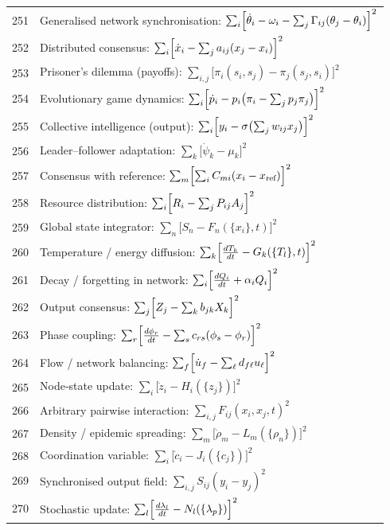 \documentclass[12pt,a4paper]{article}
\begin{document}
\begin{longtable}{r l}
		251 & Generalised network synchronisation: $\sum_i\Bigl[\dot\theta_i - \omega_i - \sum_j\Gamma_{ij}(\theta_j-\theta_i)\Bigr]^2$ \\
		252 & Distributed consensus: $\sum_i\Bigl[\dot x_i - \sum_j a_{ij}(x_j-x_i)\Bigr]^2$ \\
		253 & Prisoner's dilemma (payoffs): $\sum_{i,j}\bigl[\pi_i(s_i,s_j) - \pi_j(s_j,s_i)\bigr]^2$ \\
		254 & Evolutionary game dynamics: $\sum_i\Bigl[\dot p_i - p_i\bigl(\pi_i - \sum_j p_j\pi_j\bigr)\Bigr]^2$ \\
		255 & Collective intelligence (output): $\sum_i\Bigl[y_i - \sigma\bigl(\sum_j w_{ij}x_j\bigr)\Bigr]^2$ \\
		256 & Leader–follower adaptation: $\sum_k\bigl[\dot\psi_k - \mu_k\bigr]^2$ \\
		257 & Consensus with reference: $\sum_m\Bigl[\sum_i C_{mi}(x_i-x_{\text{ref}})\Bigr]^2$ \\
		258 & Resource distribution: $\sum_i\Bigl[R_i - \sum_j P_{ij}A_j\Bigr]^2$ \\
		259 & Global state integrator: $\sum_n\bigl[S_n - F_n(\{x_i\},t)\bigr]^2$ \\
		260 & Temperature / energy diffusion: $\sum_k\Bigl[\frac{dT_k}{dt} - G_k(\{T_l\},t)\Bigr]^2$ \\
		261 & Decay / forgetting in network: $\sum_i\Bigl[\frac{dQ_i}{dt} + \alpha_i Q_i\Bigr]^2$ \\
		262 & Output consensus: $\sum_j\Bigl[Z_j - \sum_k b_{jk}X_k\Bigr]^2$ \\
		263 & Phase coupling: $\sum_r\Bigl[\frac{d\phi_r}{dt} - \sum_s c_{rs}(\phi_s-\phi_r)\Bigr]^2$ \\
		264 & Flow / network balancing: $\sum_f\Bigl[\dot u_f - \sum_\ell d_{f\ell}u_\ell\Bigr]^2$ \\
		265 & Node‑state update: $\sum_i\bigl[\dot z_i - H_i(\{z_j\})\bigr]^2$ \\
		266 & Arbitrary pairwise interaction: $\sum_{i,j}F_{ij}(x_i,x_j,t)^2$ \\
		267 & Density / epidemic spreading: $\sum_m\bigl[\dot\rho_m - L_m(\{\rho_n\})\bigr]^2$ \\
		268 & Coordination variable: $\sum_i\bigl[\dot c_i - J_i(\{c_j\})\bigr]^2$ \\
		269 & Synchronised output field: $\sum_{i,j}S_{ij}(y_i-y_j)^2$ \\
		270 & Stochastic update: $\sum_l\Bigl[\frac{d\lambda_l}{dt} - N_l(\{\lambda_p\})\Bigr]^2$ \\

\end{longtable}
\end{document}
